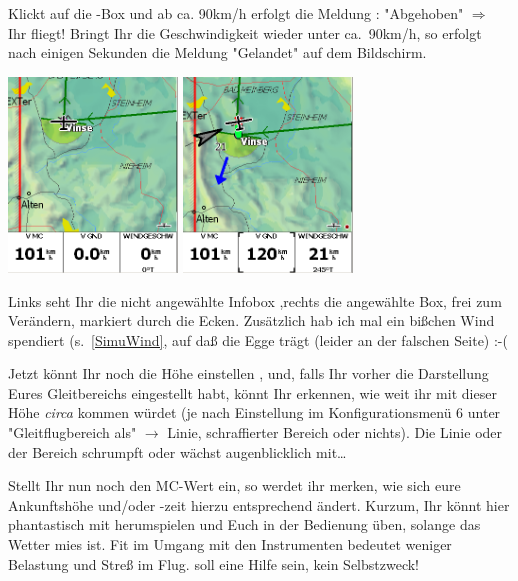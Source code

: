 Klickt auf die -Box und ab ca. 90km/h erfolgt die Meldung : "Abgehoben" $\Longrightarrow$ Ihr fliegt! Bringt Ihr die Geschwindigkeit wieder unter ca.\ 90km/h, so erfolgt nach einigen Sekunden die Meldung "Gelandet" auf dem Bildschirm.
\begin{center}
\includegraphics[width=4.5cm]{Bilder/SimInfoBoxNaktiv.png}%
\qquad
\includegraphics[width=4.5cm]{Bilder/SimInfoBoxAktiv.png}%
\end{center}
Links seht Ihr die nicht angewählte Infobox ,rechts die angewählte Box, frei zum Verändern, markiert durch die Ecken.  Zusätzlich hab ich mal ein bißchen Wind spendiert (s.~\ref{SimuWind}, auf daß die Egge trägt (leider an der falschen Seite)  :-(

Jetzt könnt Ihr noch die Höhe einstellen , und, falls Ihr vorher die Darstellung Eures Gleitbereichs eingestellt habt, könnt Ihr erkennen,
wie weit ihr mit dieser Höhe \textit{circa} kommen würdet (je nach Einstellung im Konfigurationsmenü 6 unter 
"Gleitflugbereich als" $\rightarrow$ Linie, schraffierter Bereich oder nichts). Die Linie oder der Bereich schrumpft oder wächst augenblicklich mit\dots

Stellt Ihr nun noch den MC-Wert ein, so werdet ihr merken, wie sich eure Ankunftshöhe und/oder -zeit hierzu entsprechend ändert. Kurzum, Ihr könnt hier phantastisch mit herumspielen und Euch in der Bedienung üben, solange das Wetter mies ist. Fit im Umgang mit den Instrumenten bedeutet weniger Belastung und Streß im Flug. \xc soll eine Hilfe sein, kein Selbstzweck!


